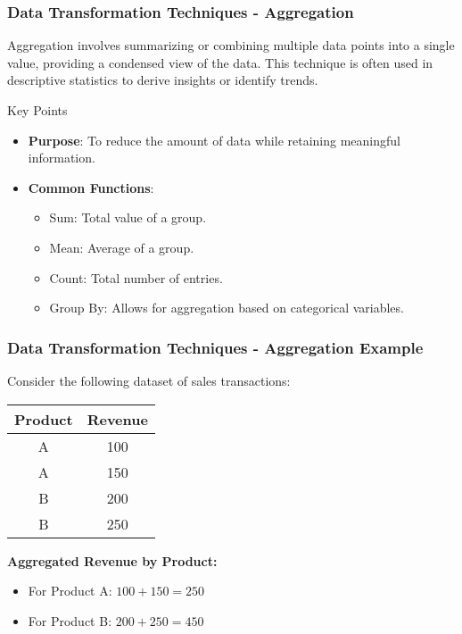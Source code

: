 \documentclass[aspectratio=169]{beamer}
\begin{document}
\begin{frame}[fragile]
    \frametitle{Data Transformation Techniques - Aggregation}
    Aggregation involves summarizing or combining multiple data points into a single value, providing a condensed view of the data. This technique is often used in descriptive statistics to derive insights or identify trends.
    
    \begin{block}{Key Points}
        \begin{itemize}
            \item \textbf{Purpose}: To reduce the amount of data while retaining meaningful information.
            \item \textbf{Common Functions}:
                \begin{itemize}
                    \item Sum: Total value of a group.
                    \item Mean: Average of a group.
                    \item Count: Total number of entries.
                    \item Group By: Allows for aggregation based on categorical variables.
                \end{itemize}
        \end{itemize}
    \end{block}
\end{frame}

\begin{frame}[fragile]
    \frametitle{Data Transformation Techniques - Aggregation Example}
    Consider the following dataset of sales transactions:
    \begin{center}
        \begin{tabular}{|c|c|}
            \hline
            Product & Revenue \\
            \hline
            A       & 100     \\
            A       & 150     \\
            B       & 200     \\
            B       & 250     \\
            \hline
        \end{tabular}
    \end{center}
    
    \textbf{Aggregated Revenue by Product:}
    \begin{itemize}
        \item For Product A: $100 + 150 = 250$
        \item For Product B: $200 + 250 = 450$
    \end{itemize}
\end{frame}
\end{document}
